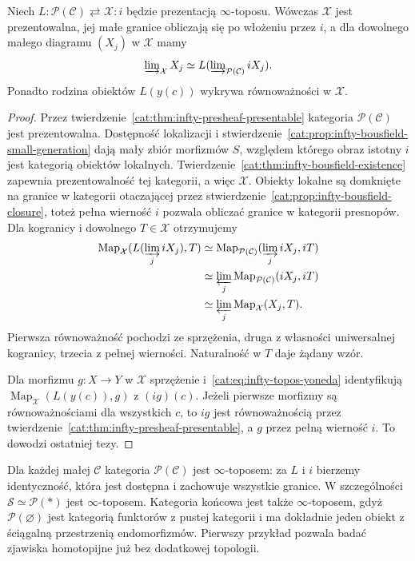 \begin{stwierdzenie}\label{cat:prop:infty-topos-presentation}
Niech $L:\mathcal P(\mathcal C)\rightleftarrows\mathcal X:i$ będzie prezentacją $\infty$-toposu. Wówczas $\mathcal X$ jest prezentowalna, jej małe granice obliczają się po włożeniu przez $i$, a dla dowolnego małego diagramu $(X_j)$ w $\mathcal X$ mamy
\[
 \varinjlim\nolimits_{\mathcal X} X_j
 \simeq L(\varinjlim\nolimits_{\mathcal P(\mathcal C)}iX_j).
\]
Ponadto rodzina obiektów $L(y(c))$ wykrywa równoważności w $\mathcal X$.
\end{stwierdzenie}
\begin{proof}
Przez twierdzenie~\ref{cat:thm:infty-presheaf-presentable} kategoria $\mathcal P(\mathcal C)$ jest prezentowalna. Dostępność lokalizacji i stwierdzenie~\ref{cat:prop:infty-bousfield-small-generation} dają mały zbiór morfizmów $S$, względem którego obraz istotny $i$ jest kategorią obiektów lokalnych. Twierdzenie~\ref{cat:thm:infty-bousfield-existence} zapewnia prezentowalność tej kategorii, a więc $\mathcal X$. Obiekty lokalne są domknięte na granice w kategorii otaczającej przez stwierdzenie~\ref{cat:prop:infty-bousfield-closure}, toteż pełna wierność $i$ pozwala obliczać granice w kategorii presnopów. Dla kogranicy i dowolnego $T\in\mathcal X$ otrzymujemy
\[
\begin{aligned}
 \operatorname{Map}_{\mathcal X}
 (L(\varinjlim_j iX_j),T)
 &\simeq\operatorname{Map}_{\mathcal P(\mathcal C)}
  (\varinjlim_j iX_j,iT)\\
 &\simeq\varprojlim_j\operatorname{Map}_{\mathcal P(\mathcal C)}(iX_j,iT)\\
 &\simeq\varprojlim_j\operatorname{Map}_{\mathcal X}(X_j,T).
\end{aligned}
\]
Pierwsza równoważność pochodzi ze sprzężenia, druga z własności uniwersalnej kogranicy, trzecia z pełnej wierności. Naturalność w $T$ daje żądany wzór.

Dla morfizmu $g:X\to Y$ w $\mathcal X$ sprzężenie i~\eqref{cat:eq:infty-topos-yoneda} identyfikują $\operatorname{Map}_{\mathcal X}(L(y(c)),g)$ z $(ig)(c)$. Jeżeli pierwsze morfizmy są równoważnościami dla wszystkich $c$, to $ig$ jest równoważnością przez twierdzenie~\ref{cat:thm:infty-presheaf-presentable}, a $g$ przez pełną wierność $i$. To dowodzi ostatniej tezy.
\end{proof}

\begin{przyklad}\label{cat:ex:infty-topos-presheaf}
Dla każdej małej $\mathcal C$ kategoria $\mathcal P(\mathcal C)$ jest $\infty$-toposem: za $L$ i $i$ bierzemy identyczność, która jest dostępna i zachowuje wszystkie granice. W szczególności $\mathcal S\simeq\mathcal P(*)$ jest $\infty$-toposem. Kategoria końcowa jest także $\infty$-toposem, gdyż $\mathcal P(\varnothing)$ jest kategorią funktorów z pustej kategorii i ma dokładnie jeden obiekt z ściągalną przestrzenią endomorfizmów. Pierwszy przykład pozwala badać zjawiska homotopijne już bez dodatkowej topologii.
\end{przyklad}

